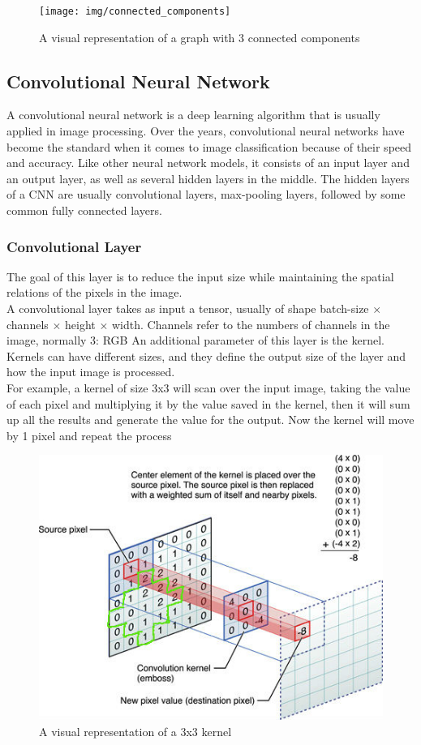 \documentclass{article}
\begin{document}
{\begin{figure}[h]
	\centering
	\texttt{[image: img/connected\_components]}
	\caption{A visual representation of a graph with 3 connected components}
	\label{fig:2}
\end{figure}


\subsection{Convolutional Neural Network}
A convolutional neural network is a deep learning algorithm that is usually applied in image processing.
Over the years, convolutional neural networks have become the standard when it comes to image classification because of their speed and accuracy.
Like other neural network models, it consists of an input layer and an output layer, as well as several hidden layers in the middle.
The hidden layers of a CNN are usually convolutional layers, max-pooling layers, followed by some common fully connected layers.

\subsubsection{Convolutional Layer}
The goal of this layer is to reduce the input size while maintaining the spatial relations of the pixels in the image.\\
A convolutional layer takes as input a tensor, usually of shape batch-size $\times$ channels $\times$ height $\times$ width. Channels refer to the numbers of channels in the image, normally 3: RGB
An additional parameter of this layer is the kernel. Kernels can have different sizes, and they define the output size of the layer and how the input image is processed.\\
For example, a kernel of size 3x3 will scan over the input image, taking the value of each pixel and multiplying it by the value saved in the kernel, then it will sum up all the results and generate the value for the output. Now the kernel will move by 1 pixel and repeat the process

\begin{figure}[H]
	\centering
	\includegraphics[width=0.4\linewidth]{img/kernel}
	\caption{A visual representation of a 3x3 kernel}
	\label{fig:3}
\end{figure}

}
\end{document}
